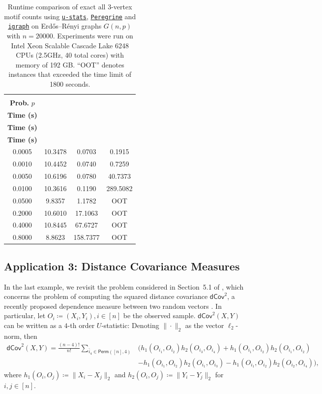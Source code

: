 \documentclass[12pt]{article}
\newcommand{\libref}[2]{\href{#2}{\texttt{#1}}}
\def\package{\libref{u-stats}{https://github.com/zrq1706/U-Statistics-Python}}
\def\igraph{\libref{igraph}{https://igraph.org/}}
\theoremstyle{plain}
\theoremstyle{definition}
\newcommand{\perm}[1]{\mathsf{Perm}(#1)}
\def\package{\libref{u-stats}{https://github.com/zrq1706/U-Statistics-Python}}
\def\igraph{\libref{igraph}{https://igraph.org/}}
\def\peregrine{\libref{Peregrine}{https://github.com/pdclab/peregrine}}
\begin{document}
\begin{bibunit}[agsm]
\begin{table}[ht]
\centering
\caption{
Runtime comparison of exact all $3$-vertex motif counts using \package{}, \peregrine{} and \igraph{} on Erd\H{o}s--R\'enyi graphs $G(n, p)$ with $n = 20000$. 
Experiments were run on Intel Xeon Scalable Cascade Lake 6248 CPUs (2.5GHz, 40 total cores) with memory of 192 GB.
``OOT'' denotes instances that exceeded the time limit of 1800 seconds.
}
\label{tab:motif_counts_3}
\begin{tabular}{cccc}
\toprule
\makecell{\textbf{Edge} \\ \textbf{Prob.} $p$} & \makecell{\textbf{\package{}} \\ \textbf{Time (s)}} & \makecell{\textbf{\peregrine{}} \\ \textbf{Time (s)}} & \makecell{\textbf{\igraph{}} \\ \textbf{Time (s)}} \\
\midrule
0.0005 & 10.3478 & 0.0703 & 0.1915 \\
0.0010 & 10.4452 & 0.0740 & 0.7259 \\
0.0050 & 10.6196 & 0.0780 & 40.7373 \\
0.0100 & 10.3616 & 0.1190 & 289.5082 \\
0.0500 & 9.8357 & 1.1782 & OOT \\
0.2000 & 10.6010 & 17.1063 & OOT \\
0.4000 & 10.8445 & 67.6727 & OOT \\
0.8000 & 8.8623 & 158.7377 & OOT \\
\bottomrule
\end{tabular}
\end{table}

\subsection{Application 3: Distance Covariance Measures}
\label{sec:dependence}

In the last example, we revisit the problem considered in Section~5.1 of \citet{shao2025u}, which concerns the problem of computing the squared distance covariance $\mathsf{dCov}^2$, a recently proposed dependence measure between two random vectors \citep{szekely2007measuring, yao2018testing}. In particular, let $O_i \coloneqq (X_i, Y_i), i \in [n]$ be the observed sample. $\mathsf{dCov}^2 (X, Y)$ can be written as a $4$-th order $U$-statistic: Denoting $\|\cdot\|_2$ as the vector $\ell_2$-norm, then
\begin{align*}
    \mathsf{dCov}^2(X, Y) = \frac{(n - 4)!}{n!} \sum_{\bar{i}_{4} \in \perm{[n],4}} & \Bigg( h_1 (O_{i_1}, O_{i_2}) h_2 (O_{i_3}, O_{i_4}) + h_1 (O_{i_1}, O_{i_2}) h_2 (O_{i_1}, O_{i_2}) \\
    & - h_1 (O_{i_1}, O_{i_2}) h_2 (O_{i_1}, O_{i_3}) - h_1 (O_{i_1}, O_{i_2}) h_2 (O_{i_2}, O_{i_4}) \Bigg), 
\end{align*}
where $h_1 (O_i, O_j) \coloneqq \|X_i - X_j\|_2$ and $h_2 (O_i, O_j) \coloneqq \|Y_i - Y_j\|_2$ for $i, j \in [n]$. 


\end{bibunit}
\end{document}
